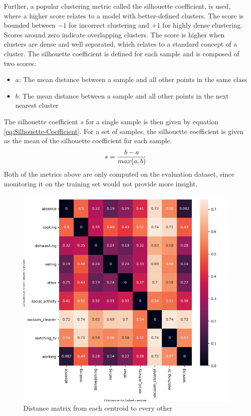 \newline
\newline
Further, a popular clustering metric called the silhouette coefficient, is used, where a higher score relates to a model with better-defined clusters. The score is bounded between $-1$ for incorrect clustering and $+1$ for highly dense clustering. Scores around zero indicate overlapping clusters. The score is higher when clusters are dense and well separated, which relates to a standard concept of a cluster. The silhouette coefficient is defined for each sample and is composed of two scores:
\begin{itemize}
\setlength\itemsep{0em}
    \item $a$: The mean distance between a sample and all other points in the same class
    \item $b$: The mean distance between a sample and all other points in the next nearest cluster
\end{itemize}
The silhouette coefficient $s$ for a single sample is then given by equation \ref{eq:Silhouette-Coefficient}. For a set of samples, the silhouette coefficient is given as the mean of the silhouette coefficient for each sample.
\begin{equation}
    \centering
    \begin{gathered}
        s = \frac{b - a}{max(a, b)}
    \end{gathered}
    \label{eq:Silhouette-Coefficient}
\end{equation}
Both of the metrics above are only computed on the evaluation dataset, since monitoring it on the training set would not provide more insight.
\begin{figure}[htbp]
	\centering
	\includegraphics[scale=0.25]{img/Distance_Metric.png}
	\caption{Distance matrix from each centroid to every other}
	\label{fig:Distance-Matrix}
\end{figure}

